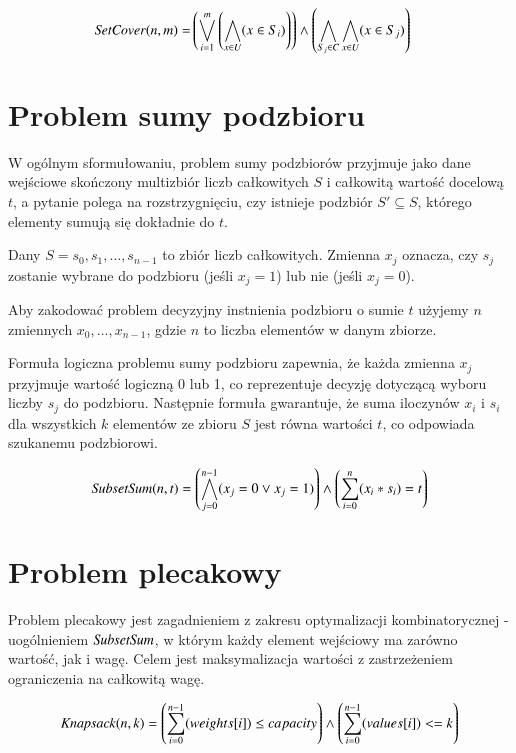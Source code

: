 \begin{align*}
	{\mathit{SetCover}}(n, m) = &\left( \bigvee_{i=1}^{m} \left( \bigwedge_{x\in U} (x \in S_i) \right) \right) \land 
	\left( \bigwedge_{S_j\in C} \bigwedge_{x\in U} (x \in S_j) \right)
\end{align*}


\section{Problem sumy podzbioru}
W ogólnym sformułowaniu, problem sumy podzbiorów przyjmuje jako dane wejściowe
skończony multizbiór liczb całkowitych $S$ i całkowitą wartość docelową $t$,
a pytanie polega na rozstrzygnięciu, czy istnieje podzbiór $S' \subseteq S$,
którego elementy sumują się dokładnie do $t$.



Dany $S = {s_0, s_1, \ldots, s_{n-1}}$ to zbiór liczb całkowitych. Zmienna $x_j$ oznacza, czy $s_j$ zostanie wybrane do podzbioru (jeśli $x_j = 1$) lub nie (jeśli $x_j = 0$).

Aby zakodować problem decyzyjny instnienia podzbioru o sumie $t$ użyjemy $n$ zmiennych $x_0,\ldots,x_{n-1}$, gdzie $n$ to liczba elementów w danym zbiorze.

Formuła logiczna problemu sumy podzbioru zapewnia, że każda zmienna $x_j$ przyjmuje wartość logiczną 0 lub 1, co reprezentuje decyzję dotyczącą wyboru liczby $s_j$ do podzbioru. Następnie formuła gwarantuje, że suma iloczynów $x_i$ i $s_i$ dla wszystkich \(k\) elementów ze zbioru $S$ jest równa wartości $t$, co odpowiada szukanemu podzbiorowi.

\begin{align*}
	{\mathit{SubsetSum}}(n, t) = \left( \bigwedge_{j=0}^{n-1} (x_j = 0 \lor x_j = 1) \right) \land 
	\left( \sum_{i=0}^{n} (x_i * s_i) = t \right)
\end{align*}




\section{Problem plecakowy}
Problem plecakowy jest zagadnieniem z zakresu optymalizacji kombinatorycznej - uogólnieniem ${\mathit{SubsetSum}}$, w którym każdy element wejściowy ma zarówno wartość, jak i wagę. Celem jest maksymalizacja wartości z zastrzeżeniem ograniczenia na całkowitą wagę.

\begin{align*}
	{\mathit{Knapsack}}(n, k) = \left( \sum_{i=0}^{n-1} (weights[i]) \leq capacity \right) \land 
	\left( \sum_{i=0}^{n-1} (values[i]) <= k \right)
\end{align*}



